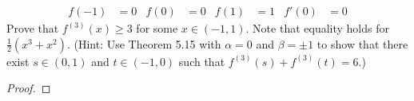 \documentclass[../psets.tex]{subfiles}
\begin{document}
\begin{enumerate}[label={\textbf{\arabic*.}}]
    \begin{align*}
        f(-1) &= 0&
        f(0) &= 0&
        f(1) &= 1&
        f'(0) &= 0
    \end{align*}
    Prove that $f^{(3)}(x)\geq 3$ for some $x\in(-1,1)$. Note that equality holds for $\frac{1}{2}(x^3+x^2)$. (Hint: Use Theorem 5.15 with $\alpha=0$ and $\beta=\pm 1$ to show that there exist $s\in(0,1)$ and $t\in(-1,0)$ such that $f^{(3)}(s)+f^{(3)}(t)=6$.)
    \begin{proof}

\end{proof}
\end{enumerate}
\end{document}

